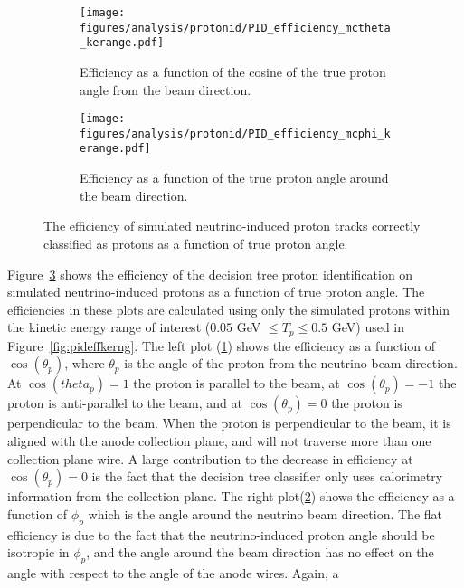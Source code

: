     \begin{figure}[h]
      \centering
      \begin{subfigure}[t]{2.8in}
        \texttt{[image: figures/analysis/protonid/PID\_efficiency\_mctheta\_kerange.pdf]}
        \caption{Efficiency as a function of the cosine of the true proton
          angle from the beam direction.}
        \label{fig:pideffangletheta}
      \end{subfigure}
      \hspace{2pt}
      \begin{subfigure}[t]{2.8in}
        \texttt{[image: figures/analysis/protonid/PID\_efficiency\_mcphi\_kerange.pdf]}
        \caption{Efficiency as a function of the true proton angle around the beam direction.}
        \label{fig:pideffanglephi}
      \end{subfigure}
      \caption{The efficiency of simulated neutrino-induced proton tracks
        correctly classified as protons as a function of true proton angle.}
      \label{fig:pideffangle}
    \end{figure}
    Figure~\ref{fig:pideffangle} shows the efficiency of the decision tree proton
    identification on simulated neutrino-induced protons as a function of true
    proton angle. The efficiencies in these plots are calculated using only the
    simulated protons within the kinetic energy range of interest ($0.05$ GeV
    $\le T_p \le 0.5$ GeV) used in Figure~\ref{fig:pideffkerng}. The left plot
    (\ref{fig:pideffangletheta}) shows the efficiency as a function of
    $\cos(\theta_p)$, where $\theta_p$ is the angle of the proton from the
    neutrino beam direction. At $\cos(theta_p) = 1$ the proton is parallel to
    the beam, at $\cos(\theta_p) = -1$ the proton is anti-parallel to the beam,
    and at $\cos(\theta_p) = 0$ the proton is perpendicular to the beam. When
    the proton is perpendicular to the beam, it is aligned with the anode
    collection plane, and will not traverse more than one collection plane
    wire. A large contribution to the decrease in efficiency at $\cos(\theta_p)
    = 0$ is the fact that the decision tree classifier only uses calorimetry
    information from the collection plane. The right
    plot(\ref{fig:pideffanglephi}) shows the efficiency as a function of
    $\phi_p$ which is the angle around the neutrino beam direction. The flat
    efficiency is due to the fact that the neutrino-induced proton angle should
    be isotropic in $\phi_p$, and the angle around the beam direction has no
    effect on the angle with respect to the angle of the anode wires. Again, a
